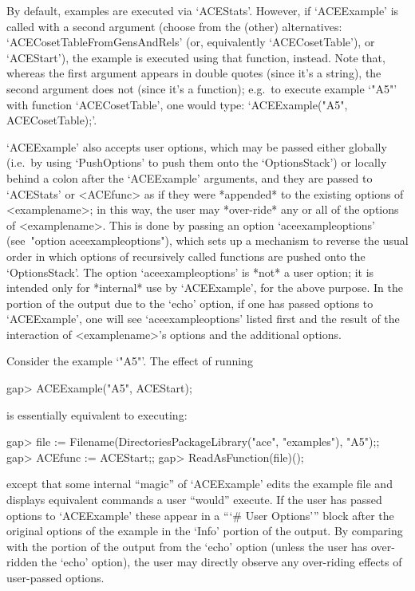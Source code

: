 By  default,  examples  are  executed  via  `ACEStats'.  However,   if
`ACEExample' is called with a second argument (choose from the (other)
alternatives:   `ACECosetTableFromGensAndRels'    (or,    equivalently
`ACECosetTable'), or `ACEStart'), the example is executed  using  that
function, instead. Note that, whereas the first  argument  appears  in
double quotes (since it's a string),  the  second  argument  does  not
(since it's a function); e.g.~to execute example `"A5"' with  function
`ACECosetTable', one would type: `ACEExample("A5", ACECosetTable);'.

`ACEExample' also accepts user options, which  may  be  passed  either
globally  (i.e.~by  using  `PushOptions'  to  push   them   onto   the
`OptionsStack') or locally  behind  a  colon  after  the  `ACEExample'
arguments, and they are passed to `ACEStats' or <ACEfunc> as  if  they
were *appended* to the existing options of <examplename>; in this way,
the user may *over-ride* any or all of the options  of  <examplename>.
This is done by passing  an  option  `aceexampleoptions'  (see~"option
aceexampleoptions"), which sets up a mechanism to  reverse  the  usual
order in which options of recursively called functions are pushed onto
the `OptionsStack'. The option `aceexampleoptions'  is  *not*  a  user
option; it is intended only for *internal* use  by  `ACEExample',  for
the above purpose. In the portion of the  output  due  to  the  `echo'
option, if one has  passed  options  to  `ACEExample',  one  will  see
`aceexampleoptions' listed first and the result of the interaction  of
<examplename>'s options and the additional options.

Consider the example `"A5"'. The effect of running

\beginexample
gap> ACEExample("A5", ACEStart);

\endexample

is essentially equivalent to executing:

\beginexample
gap> file := Filename(DirectoriesPackageLibrary("ace", "examples"), "A5");;
gap> ACEfunc := ACEStart;;
gap> ReadAsFunction(file)();

\endexample

except that some internal ``magic'' of `ACEExample' edits the  example
file and displays equivalent commands a user ``would'' execute. If the
user  has  passed  options  to  `ACEExample'   these   appear   in   a
```\# User Options''' block after the original options of the  example
in the `Info' portion of the output. By comparing with the portion  of
the output from the `echo' option (unless the user has over-ridden the
`echo' option), the user may directly observe any over-riding  effects
of user-passed options.

